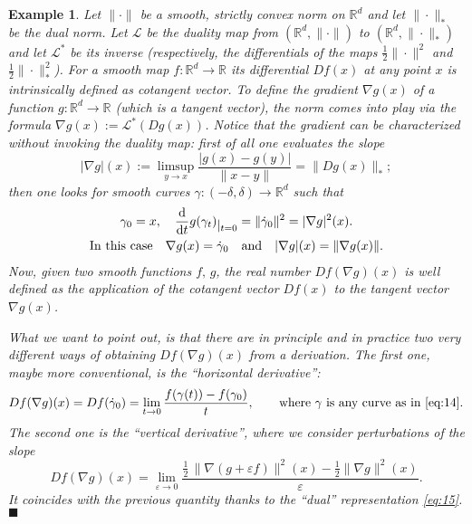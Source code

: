 \documentclass[reqno,11pt]{article}
\numberwithin{equation}{section}
\newcommand{\R}{\mathbb{R}}
\renewcommand{\d}{{\mathrm d}}
\newcommand{\restr}[1]{\lower3pt\hbox{$|_{#1}$}}
\newcommand{\eps}{\varepsilon}
\newtheorem{example}[theorem]{Example}
\newcommand{\fr}{\hfill$\blacksquare$}                      %
\begin{document}
\begin{example}{\rm
Let $\|\cdot\|$ be a smooth, strictly convex norm on $\R^d$ and let
$\|\cdot\|_*$ be the dual norm. Let $\mathcal L$ be the duality map
from $(\R^d,\|\cdot\|)$ to $(\R^d,\|\cdot\|_*)$ and let $\mathcal
L^*$ be its inverse (respectively, the differentials of the maps
$\frac12\|\cdot\|^2$ and $\frac 12\|\cdot\|_*^2$). For a smooth map
$f:\R^d\to\R$ its differential $Df(x)$ at any point $x$ is
intrinsically defined as cotangent vector. To define the gradient
$\nabla g(x)$ of a function $g:\R^d\to\R$ (which is a tangent
vector), the norm comes into play via the formula $\nabla
g(x):=\mathcal L^*(Dg(x))$. Notice that the gradient can be
characterized without invoking the duality map: first of all one
evaluates the slope
\begin{equation}
\label{eq:15}
  |\nabla g|(x):=\limsup_{y\to x}\frac{|g(x)-g(y)|}{\|x-y\|}=\|Dg(x)\|_*;
\end{equation}
then one looks for smooth curves $\gamma:(-\delta,\delta)\to\R^d$ such that
\begin{equation}\label{eq:14}
  \begin{gathered}
  \gamma_0=x,\quad
  \frac \d{\d t}g(\gamma_t)\restr{t=0}
  =\|\dot \gamma_0\|^2=|\nabla g|^2(x).\\
  \text{In this case}\quad
  \nabla g(x)=\dot\gamma_0\quad\text{and}\quad
  |\nabla g|(x)=\|\nabla g(x)\|.
\end{gathered}
\end{equation}
Now, given two smooth functions $f,\,g$, the real number $Df(\nabla
g)(x)$ is well defined as the application of the cotangent vector
$Df(x)$ to the tangent vector $\nabla g(x)$.

What we want to point out, is that there are in principle and in
practice two very different ways of obtaining $Df(\nabla g)(x)$ from
a derivation. The first one, maybe more conventional, is the ``horizontal
derivative'':
\begin{displaymath}
Df(\nabla g)(x)= Df(\dot \gamma_0)=\lim_{t\to
  0}\frac{f(\gamma(t))-f(\gamma_0)}t,\qquad
\text{where $\gamma$ is any curve as in \eqref{eq:14}.}
\end{displaymath}
The second one is the ``vertical derivative'', where we consider
perturbations of the slope
\begin{displaymath}
Df(\nabla g)(x)=\lim_{\eps\to0}\frac{\frac12\,\|\nabla(g+\eps
  f)\|^2(x)-\frac12\|\nabla g\|^2(x)}{\eps}.
\end{displaymath}
It coincides with the previous quantity thanks to the ``dual''
representation \eqref{eq:15}.\fr}\end{example}
\end{document}
